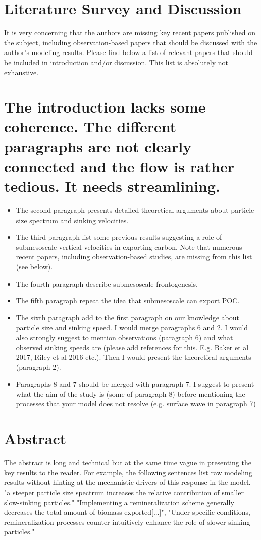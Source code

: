 \documentclass[12pt,letter]{article}
\begin{document}
\section*{Literature Survey and Discussion}
It is very concerning that the authors are missing key recent papers published on the subject, including observation-based papers that should be discussed with the author's modeling results. Please find below a list of relevant papers that should be included in introduction and/or discussion. This list is absolutely not exhaustive. 



\section*{The introduction lacks some coherence. The different paragraphs are not clearly connected and the flow is rather tedious. It needs streamlining. }
\begin{itemize}
	\item	The second paragraph presents detailed theoretical arguments about particle size spectrum and sinking velocities. 
	\item	The third paragraph list some previous results suggesting a role of submesoscale vertical velocities in exporting carbon. Note that numerous recent papers, including observation-based studies, are missing from this list (see below).
	\item	The fourth paragraph describe submesoscale frontogenesis.
	\item	The fifth paragraph repeat the idea that submesoscale can export POC.
	\item	The sixth paragraph add to the first paragraph on our knowledge about particle size and sinking speed. I would merge paragraphs 6 and 2. I would also strongly suggest to mention observations (paragraph 6) and what observed sinking speeds are (please add references for this. E.g. Baker et al 2017, Riley et al 2016 etc.). Then I would present the theoretical arguments (paragraph 2). 
	\item	Paragraphs 8 and 7 should be merged with paragraph 7. I suggest to present what the aim of the study is (some of paragraph 8) before mentioning the processes that your model does not resolve (e.g. surface wave in paragraph 7)
\end{itemize}

\section*{Abstract}
The abstract is long and technical but at the same time vague in presenting the key results to the reader. For example, the following sentences list raw modeling results without hinting at the mechanistic drivers of this response in the model. 
"a steeper particle size spectrum increases the relative contribution of smaller slow-sinking particles." "Implementing a remineralization scheme generally decreases the total amount of biomass exported[...]", "Under specific conditions, remineralization processes counter-intuitively enhance the role of slower-sinking particles."
\end{document}

